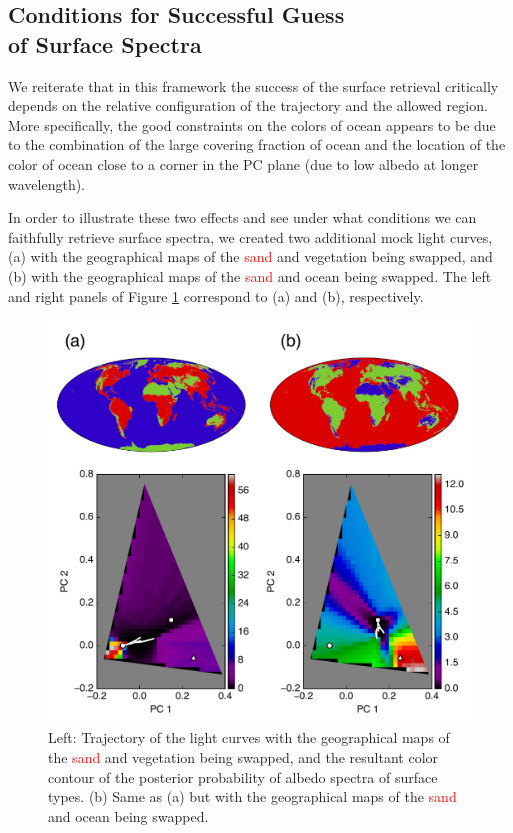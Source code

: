 \documentclass[iop,numberedappendix,apj]{emulateapj}
\def\edit#1{\textcolor{red}{#1}}
\begin{document}
\subsection{Conditions for Successful Guess\\of Surface Spectra}
\label{ss:guess}


We reiterate that in this framework the success of the surface retrieval critically depends on the relative configuration of the trajectory and the allowed region. 
More specifically, the good constraints on the colors of ocean appears to be due to the combination of the large covering fraction of ocean and the location of the color of ocean close to a corner in the PC plane (due to low albedo at longer wavelength). 

In order to illustrate these two effects and see under what conditions we can faithfully retrieve surface spectra, we created two additional mock light curves, (a) with the geographical maps of the \edit{sand} and vegetation being swapped, and  (b) with the geographical maps of the \edit{sand} and ocean being swapped. 
The left and right panels of Figure \ref{fig:swap} correspond to (a) and (b), respectively. 

\begin{figure}[htb!]
    \begin{center}
    \includegraphics[width=\hsize]{swap.pdf}
    \end{center}
    \caption{Left: Trajectory of the light curves with the geographical maps of the \edit{sand} and vegetation being swapped, and the resultant color contour of the posterior probability of albedo spectra of surface types. (b) Same as (a) but with the geographical maps of the \edit{sand} and ocean being swapped.}
\label{fig:swap}
\end{figure}
\end{document}
